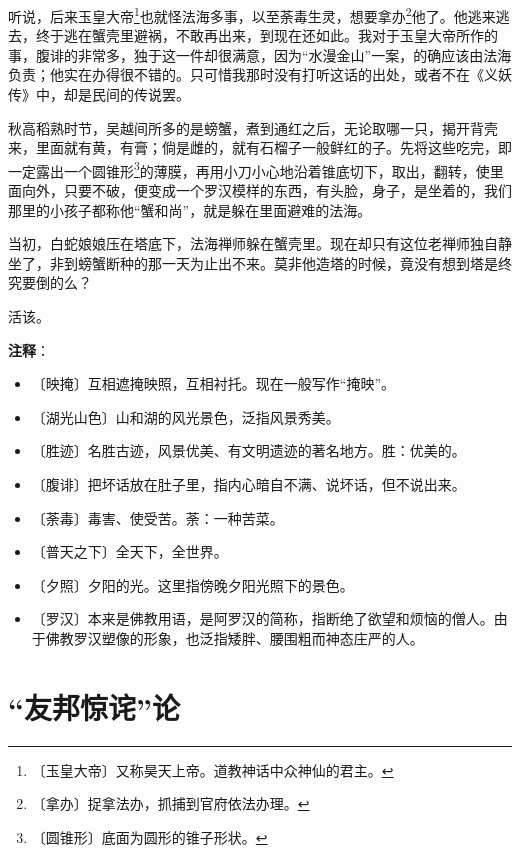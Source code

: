 \documentclass[12pt,UTF-8,openany]{ctexbook}
\begin{document}
\begin{large}
    听说，后来玉皇大帝\footnote{〔玉皇大帝〕又称昊天上帝。道教神话中众神仙的君主。}也就怪法海多事，以至荼毒生灵，想要拿办\footnote{〔拿办〕捉拿法办，抓捕到官府依法办理。}他了。他逃来逃去，终于逃在蟹壳里避祸，不敢再出来，到现在还如此。我对于玉皇大帝所作的事，腹诽的非常多，独于这一件却很满意，因为“水漫金山”一案，的确应该由法海负责；他实在办得很不错的。只可惜我那时没有打听这话的出处，或者不在《义妖传》中，却是民间的传说罢。
    
    秋高稻熟时节，吴越间所多的是螃蟹，煮到通红之后，无论取哪一只，揭开背壳来，里面就有黄，有膏；倘是雌的，就有石榴子一般鲜红的子。先将这些吃完，即一定露出一个圆锥形\footnote{〔圆锥形〕底面为圆形的锥子形状。}的薄膜，再用小刀小心地沿着锥底切下，取出，翻转，使里面向外，只要不破，便变成一个罗汉模样的东西，有头脸，身子，是坐着的，我们那里的小孩子都称他“蟹和尚”，就是躲在里面避难的法海。
    
    当初，白蛇娘娘压在塔底下，法海禅师躲在蟹壳里。现在却只有这位老禅师独自静坐了，非到螃蟹断种的那一天为止出不来。莫非他造塔的时候，竟没有想到塔是终究要倒的么？
    
    活该。
    
\end{large}


\newpage

\textbf{注释}：

\vspace{-1em}

\begin{itemize}
    \setlength\itemsep{-0.2em}
    \item 〔映掩〕互相遮掩映照，互相衬托。现在一般写作“掩映”。
    \item 〔湖光山色〕山和湖的风光景色，泛指风景秀美。
    \item 〔胜迹〕名胜古迹，风景优美、有文明遗迹的著名地方。胜：优美的。
    \item 〔腹诽〕把坏话放在肚子里，指内心暗自不满、说坏话，但不说出来。
    \item 〔荼毒〕毒害、使受苦。荼：一种苦菜。
    \item 〔普天之下〕全天下，全世界。
    \item 〔夕照〕夕阳的光。这里指傍晚夕阳光照下的景色。
    \item 〔罗汉〕本来是佛教用语，是阿罗汉的简称，指断绝了欲望和烦恼的僧人。由于佛教罗汉塑像的形象，也泛指矮胖、腰围粗而神态庄严的人。
\end{itemize}

\chapter{“友邦惊诧”论}
\end{document}
